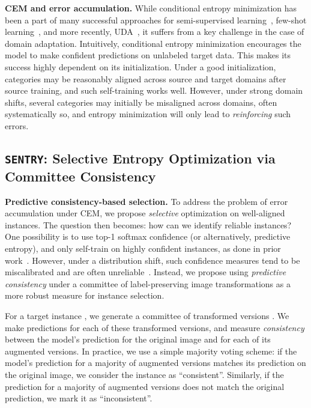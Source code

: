 \documentclass[10pt,twocolumn,letterpaper]{article}
\newcommand{\method}{\texttt{SENTRY}\xspace}
\begin{document}
\noindent \textbf{CEM and error accumulation.} While conditional entropy minimization has been a part of many successful approaches for semi-supervised learning~\cite{grandvalet2005semi,berthelot2019mixmatch}, few-shot learning~\cite{dhillon2019baseline}, and more recently, UDA~\cite{saito2019semi,li2020rethinking}, it suffers from a key challenge in the case of domain adaptation. Intuitively, conditional entropy minimization encourages the model to make confident predictions on unlabeled target data. This makes its success highly dependent on its initialization. Under a good initialization, categories may be reasonably aligned across source and target domains after source training, and such self-training works well. However, under strong domain shifts, several categories may initially be misaligned across domains, often systematically so, and entropy minimization will only lead to \emph{reinforcing} such errors.

\vspace{-4pt}
\subsection{\method: Selective Entropy Optimization via Committee Consistency}
\vspace{-4pt}

\noindent \textbf{Predictive consistency-based selection.} To address the problem of error accumulation under CEM, we propose \emph{selective} optimization on well-aligned instances. The question then becomes: how can we identify reliable instances? One possibility is to use top-1 softmax confidence (or alternatively, predictive entropy), and only self-train on highly confident instances, as done in prior work~\cite{tan2019generalized}. However, under a distribution shift, such confidence measures tend to be miscalibrated and are often unreliable~\cite{snoek2019can}. Instead, we propose using \emph{predictive consistency} under a committee of label-preserving image transformations as a more robust measure for instance selection.

For a target instance , we generate a committee of  transformed versions . 
We make predictions for each of these  transformed versions, and measure \emph{consistency} between the model's prediction for the original image and for each of its  augmented versions. In practice, we use a simple majority voting scheme: if the model's prediction for a majority of augmented versions matches its prediction on the original image, we consider the instance as ``consistent''. Similarly, if the prediction for a majority of augmented versions does not match the original prediction, we mark it as ``inconsistent''. 
\end{document}
